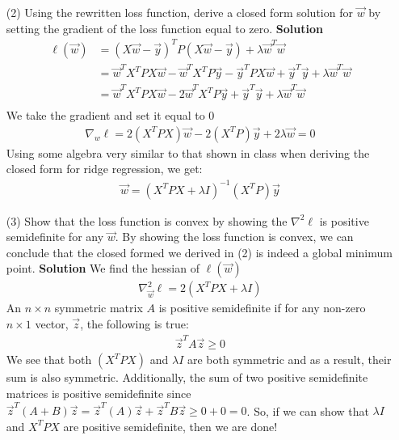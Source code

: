 \documentclass[11pt]{article}
\begin{document}
\begin{enumerate}[(1)]
		\item[(2)] Using the rewritten loss function, derive a closed form solution for $\vec{w}$ by setting the gradient of the loss function equal to zero.
		\newline
		\newline
		\textbf{Solution}
		\begin{align*}
		\ell(\vec{w}) &= (X\vec{w} - \vec{y})^TP(X\vec{w} - \vec{y}) + \lambda \vec{w}^T \vec{w} \\
		&= \vec{w}^TX^TPX\vec{w} - \vec{w}^TX^TP\vec{y}- \vec{y}^TPX\vec{w} + \vec{y}^T\vec{y} + \lambda \vec{w}^T \vec{w} \\
		&= \vec{w}^TX^TPX\vec{w} - 2\vec{w}^TX^TP\vec{y} + \vec{y}^T\vec{y} + \lambda \vec{w}^T \vec{w} \\
		\end{align*}
		We take the gradient and set it equal to 0
		\begin{align}
		\nabla_w \ell = 2(X^TPX)\vec{w} - 2(X^TP)\vec{y} +2\lambda\vec{w} = 0
		\end{align}
		Using some algebra very similar to that shown in class when deriving the closed form for ridge regression, we get:
		\begin{align}
		\vec{w} = (X^TPX + \lambda I)^{-1}(X^TP)\vec{y}
		\end{align}
		\item[(3)] Show that the loss function is convex by showing the $\nabla^2 \ell$ is positive semidefinite for any $\vec{w}$. By showing the loss function is convex, we can conclude that the closed formed we derived in (2) is indeed a global minimum point.
		\newline
		\newline
		\textbf{Solution} We find the hessian of $\ell(\vec{w})$
		\begin{align*}
		\nabla^2_{\vec{w}} \ell = 2 (X^TPX + \lambda I)
		\end{align*}
		An $n \times n$ symmetric matrix $A$ is positive semidefinite if for any non-zero $n \times1$ vector, $\vec{z}$, the following is true:
		\begin{align*}
		\vec{z}^TA\vec z \geq 0
		\end{align*}
		We see that both $(X^TPX)$ and $\lambda I$ are both symmetric and as a result, their sum is also symmetric. Additionally, the sum of two positive semidefinite matrices is positive semidefinite since $\vec{z}^T(A+B)\vec z = \vec{z}^T(A)\vec z + \vec{z}^TB\vec z \geq 0 + 0 = 0$. So, if we can show that $\lambda I$ and $X^TPX$ are positive semidefinite, then we are done!

\end{enumerate}
\end{document}

